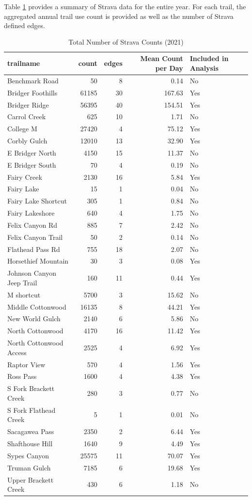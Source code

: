 \documentclass[
]{book}
\begin{document}
Table \ref{tab:strava-summary} provides a summary of Strava data for
the entire year. For each trail, the aggregated annual trail use count
is provided as well as the number of Strava defined edges.

\begin{table}

\caption{\label{tab:strava-summary}Total Number of Strava Counts (2021)}
\centering
\begin{tabular}[t]{lrrrl}
\toprule
trailname & count & edges & Mean Count per Day & Included in Analysis\\
\midrule
Benchmark Road & 50 & 8 & 0.14 & No\\
Bridger Foothills & 61185 & 30 & 167.63 & Yes\\
Bridger Ridge & 56395 & 40 & 154.51 & Yes\\
Carrol Creek & 625 & 10 & 1.71 & No\\
College M & 27420 & 4 & 75.12 & Yes\\
\addlinespace
Corbly Gulch & 12010 & 13 & 32.90 & Yes\\
E Bridger North & 4150 & 15 & 11.37 & No\\
E Bridger South & 70 & 4 & 0.19 & No\\
Fairy Creek & 2130 & 16 & 5.84 & Yes\\
Fairy Lake & 15 & 1 & 0.04 & No\\
\addlinespace
Fairy Lake Shortcut & 305 & 1 & 0.84 & No\\
Fairy Lakeshore & 640 & 4 & 1.75 & No\\
Felix Canyon Rd & 885 & 7 & 2.42 & No\\
Felix Canyon Trail & 50 & 2 & 0.14 & No\\
Flathead Pass Rd & 755 & 18 & 2.07 & No\\
\addlinespace
Horsethief Mountain & 30 & 3 & 0.08 & Yes\\
Johnson Canyon Jeep Trail & 160 & 11 & 0.44 & Yes\\
M shortcut & 5700 & 3 & 15.62 & No\\
Middle Cottonwood & 16135 & 8 & 44.21 & Yes\\
New World Gulch & 2140 & 6 & 5.86 & No\\
\addlinespace
North Cottonwood & 4170 & 16 & 11.42 & Yes\\
North Cottonwood Access & 2525 & 4 & 6.92 & Yes\\
Raptor View & 570 & 4 & 1.56 & Yes\\
Ross Pass & 1600 & 4 & 4.38 & Yes\\
S Fork Brackett Creek & 280 & 3 & 0.77 & No\\
\addlinespace
S Fork Flathead Creek & 5 & 1 & 0.01 & No\\
Sacagawea Pass & 2350 & 2 & 6.44 & Yes\\
Shafthouse Hill & 1640 & 9 & 4.49 & Yes\\
Sypes Canyon & 25575 & 11 & 70.07 & Yes\\
Truman Gulch & 7185 & 6 & 19.68 & Yes\\
\addlinespace
Upper Brackett Creek & 430 & 6 & 1.18 & No\\
\bottomrule
\end{tabular}
\end{table}
\end{document}
